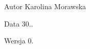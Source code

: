 \begin{DoxyAuthor}{Autor}
Karolina Morawska 
\end{DoxyAuthor}
\begin{DoxyDate}{Data}
30.. 
\end{DoxyDate}
\begin{DoxyVersion}{Wersja}
0. 
\end{DoxyVersion}
